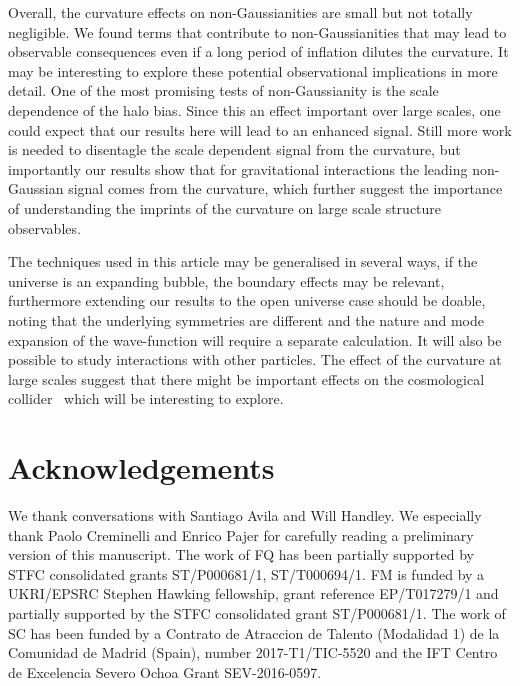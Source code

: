 \documentclass[a4paper,11pt]{article}
\numberwithin{equation}{section}
\numberwithin{equation}{section}
\begin{document}
Overall, the curvature effects on non-Gaussianities are small but not totally negligible. We found terms that contribute to non-Gaussianities that may lead to observable consequences even if a long period of inflation dilutes the curvature. It may be interesting to explore these potential observational implications in more detail. One of the most promising tests of non-Gaussianity is the scale dependence of the halo bias. Since this an effect important over large scales, one could expect that our results here will lead to an enhanced signal. Still more work is needed to disentagle the scale dependent signal from the curvature, but importantly our results show that for gravitational interactions the leading non-Gaussian  signal comes from the curvature, which further suggest the importance of understanding the imprints of the curvature on large scale structure observables. 

The techniques used in this article may be generalised in several ways, if the universe is an expanding bubble, the boundary effects may be relevant, furthermore extending our results to the open universe case should be doable, noting that the underlying symmetries are different and the nature and mode expansion of the wave-function will require a separate calculation.
 It will also be possible to study interactions with other particles. The effect of the curvature at large scales suggest that there might be important effects on the cosmological collider~\cite{Arkani-Hamed:2015bza} which will be interesting to explore.  

\section*{Acknowledgements}
We  thank conversations with Santiago Avila and Will Handley. We especially thank Paolo Creminelli and  Enrico Pajer for carefully reading a preliminary version of this manuscript. The work of FQ has been partially supported by STFC consolidated grants ST/P000681/1, ST/T000694/1. FM is funded by a
UKRI/EPSRC Stephen Hawking fellowship, grant reference EP/T017279/1 and partially supported by the
STFC consolidated grant ST/P000681/1. The work of SC has been funded by a Contrato de Atraccion de Talento (Modalidad 1) de la Comunidad de Madrid (Spain), number 2017-T1/TIC-5520 and the IFT Centro de Excelencia Severo Ochoa Grant SEV-2016-0597.

\appendix
\end{document}
